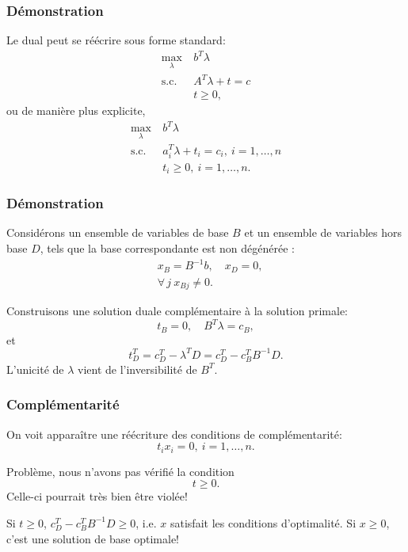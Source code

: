 \documentclass[usepdftitle=false]{beamer}
\begin{document}
\begin{frame}
	\frametitle{Démonstration}
	
	Le dual peut se réécrire sous forme standard:
	\begin{align*}
		\max_{\lambda} \ & b^T\lambda \\
		\mbox{s.c. } & A^T \lambda + t = c \\
		& t \geq 0,
	\end{align*}
	ou de manière plus explicite,
	\begin{align*}
		\max_{\lambda} \ & b^T\lambda \\
		\mbox{s.c. } & a_i^T \lambda + t_i = c_i,\ i = 1,\ldots,n \\
		& t_i \geq 0,\ i = 1,\ldots,n.
	\end{align*}
	
\end{frame}

\begin{frame}
	\frametitle{Démonstration}
	
	Considérons un ensemble de variables de base $B$ et un ensemble de variables hors base $D$, tels que la base correspondante est non dégénérée :
	\begin{align*}
		& x_B = B^{-1}b, \quad x_D = 0, \\
		& \forall\, j\ x_{Bj} \ne 0.
	\end{align*}
	
	Construisons une solution duale complémentaire à la solution primale:
	\[
	t_B = 0, \quad B^T\lambda = c_B,
	\]
	et
	$$
	t_D^T = c_D^T - \lambda^TD = c_D^T - c_B^TB^{-1}D.
	$$
	L'unicité de $\lambda$ vient de l'inversibilité de $B^T$.
	
\end{frame}

\begin{frame}
	\frametitle{Complémentarité}
	
	On voit apparaître une réécriture des conditions de complémentarité:
	\[
	t_i x_i = 0,\ i = 1,\ldots,n.
	\]
	
	\mbox{}
	
	Problème, nous n'avons pas vérifié la condition
	$$
	t \geq 0.
	$$
	Celle-ci pourrait très bien être violée!
	
	\mbox{}
	
	Si $t \geq 0$, $c_D^T - c_B^TB^{-1}D \geq 0$, i.e. $x$ satisfait les conditions d'optimalité. Si $x \geq 0$, c'est une solution de base optimale!
	
\end{frame}
\end{document}
